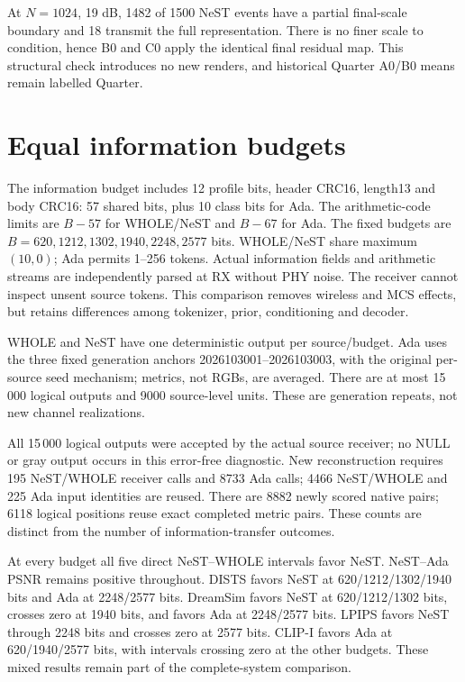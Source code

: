 \documentclass[10pt,letterpaper]{article}
\begin{document}
At $N=1024$, 19 dB, 1482 of 1500 NeST events have a partial final-scale boundary and 18 transmit the full representation. There is no finer scale to condition, hence B0 and C0 apply the identical final residual map. This structural check introduces no new renders, and historical Quarter A0/B0 means remain labelled Quarter.

\section{Equal information budgets}
The information budget includes 12 profile bits, header CRC16, length13 and body CRC16: 57 shared bits, plus 10 class bits for Ada. The arithmetic-code limits are $B-57$ for WHOLE/NeST and $B-67$ for Ada. The fixed budgets are $B=620,1212,1302,1940,2248,2577$ bits. WHOLE/NeST share maximum $(10,0)$; Ada permits 1--256 tokens. Actual information fields and arithmetic streams are independently parsed at RX without PHY noise. The receiver cannot inspect unsent source tokens. This comparison removes wireless and MCS effects, but retains differences among tokenizer, prior, conditioning and decoder.

WHOLE and NeST have one deterministic output per source/budget. Ada uses the three fixed generation anchors 2026103001--2026103003, with the original per-source seed mechanism; metrics, not RGBs, are averaged. There are at most 15\,000 logical outputs and 9000 source-level units. These are generation repeats, not new channel realizations.

All 15\,000 logical outputs were accepted by the actual source receiver; no NULL or gray output occurs in this error-free diagnostic. New reconstruction requires 195 NeST/WHOLE receiver calls and 8733 Ada calls; 4466 NeST/WHOLE and 225 Ada input identities are reused. There are 8882 newly scored native pairs; 6118 logical positions reuse exact completed metric pairs. These counts are distinct from the number of information-transfer outcomes.

At every budget all five direct NeST--WHOLE intervals favor NeST. NeST--Ada PSNR remains positive throughout. DISTS favors NeST at 620/1212/1302/1940 bits and Ada at 2248/2577 bits. DreamSim favors NeST at 620/1212/1302 bits, crosses zero at 1940 bits, and favors Ada at 2248/2577 bits. LPIPS favors NeST through 2248 bits and crosses zero at 2577 bits. CLIP-I favors Ada at 620/1940/2577 bits, with intervals crossing zero at the other budgets. These mixed results remain part of the complete-system comparison.
\end{document}
